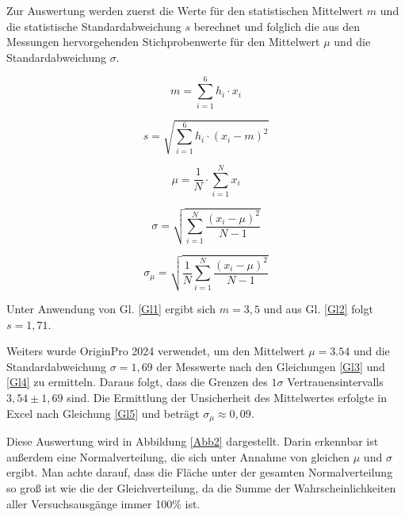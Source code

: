 \documentclass[a4paper,12pt]{article}
\begin{document}
Zur Auswertung werden zuerst die Werte für den statistischen Mittelwert $m$ und die statistische Standardabweichung 
$s$ berechnet und folglich die aus den Messungen hervorgehenden Stichprobenwerte für den Mittelwert $\mu$ und die 
Standardabweichung $\sigma$.

\begin{equation}
    \label{Gl1}
    m = \sum_{i=1}^{6} h_i \cdot x_i
\end{equation}

\begin{equation}
    \label{Gl2}
    s = \sqrt{\sum_{i=1}^{6} h_i\cdot(x_i - m)^2}
\end{equation}

\begin{equation}
    \label{Gl3}
    \mu = \frac{1}{N}\cdot \sum_{i=1}^{N} x_i
\end{equation}

\begin{equation}
    \label{Gl4}
    \sigma = \sqrt{\sum_{i=1}^{N} \frac{(x_i - \mu)^2}{N-1}}
\end{equation}

\begin{equation}
    \label{Gl5}
    \sigma_\mu = \sqrt{\frac{1}{N} \sum_{i=1}^{N} \frac{(x_i - \mu)^2}{N - 1}}
\end{equation}

\vspace{0,5cm}

Unter Anwendung von Gl. \ref{Gl1} ergibt sich $m=3,5$ und aus Gl. \ref{Gl2} folgt $s=1,71$.

Weiters wurde OriginPro 2024 verwendet, um den Mittelwert $\mu=3.54$ und die Standardabweichung $\sigma = 1,69$ der Messwerte
nach den Gleichungen \ref{Gl3} und \ref{Gl4} zu ermitteln.
Daraus folgt, dass die Grenzen des $1\sigma$ Vertrauensintervalls $3,54\pm1,69$ sind.
Die Ermittlung der Unsicherheit des Mittelwertes erfolgte in Excel nach Gleichung \ref{Gl5} und beträgt $\sigma_\mu\approx0,09$.

Diese Auswertung wird in Abbildung \ref{Abb2} dargestellt. Darin erkennbar ist außerdem eine Normalverteilung, die sich unter 
Annahme von gleichen $\mu$ und $\sigma$ ergibt. Man achte darauf, dass die Fläche unter der gesamten Normalverteilung so groß ist
wie die der Gleichverteilung, da die Summe der Wahrscheinlichkeiten aller Versuchsausgänge immer 100\% ist.
\end{document}
